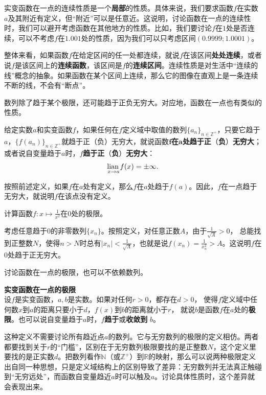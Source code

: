 \documentclass[12pt,UTF8,fontset=none]{ctexbook}
\begin{document}
实变函数在一点的连续性质是一个\textbf{局部}的性质。具体来说，我们要求函数$f$在实数$a$及其附近有定义，但“附近”可以是任意近。这说明，讨论函数在一点的连续性时，我们可以避开考虑函数在其他地方的性质。比如，我们要讨论$f$在$1$处是否连续，可以不考虑$f$在$1.001$处的性质，因为我们可以只考虑区间$(0.9999;1.0001)$。

整体来看，如果函数$f$在给定区间的任一处都连续，就说$f$在该区间\textbf{处处连续}，或者说$f$是该区间上的\textbf{连续函数}，该区间是$f$的\textbf{连续区间}。连续性质是对生活中“连续的线”概念的抽象。如果函数在某个区间上连续，那么它的图像在直观上是一条连续不断的线，不会有“断点”。

数列除了趋于某个极限，还可能趋于正负无穷大。对应地，函数在一点也有类似的性质。
\begin{df}
    给定实数$a$和实变函数$f$，如果任何在$f$定义域中取值的数列$\{a_n\}_{n\in\mathbb{Z}^+}$，只要它趋于$a$，$\{f(a_n)\}_{n\in\mathbb{Z}^+}$就趋于正（负）无穷大，就说函数$\boldsymbol{f}$\textbf{在}$\boldsymbol{a}$\textbf{处趋于正}（\textbf{负}）\textbf{无穷大}；或者说自变量趋于$a$时，$f$\textbf{趋于正}（\textbf{负}）\textbf{无穷大}：
    $$  \underset{x \to a}{\operatorname{lian}\,} f(x) = \pm\infty. $$
\end{df}
按照前述定义，如果$f$在$a$处有定义，那么$f$在$a$处趋于$f(a)$。因此，$f$在一点趋于无穷大，就说明$f$在该点没有定义。

\begin{et}
    计算函数$f: x\mapsto \displaystyle\frac{1}{x^2}$在$0$处的极限。
\end{et}
\begin{so}
    考虑任意趋于$0$的非零数列$\{x_n\}$。按照定义，对任意正数$A$，由于$\frac{1}{\sqrt{A}} > 0$，
    总能找到正整数$N$，使得$n>N$时总有$|x_n| < \frac{1}{\sqrt{A}}$，也就是说$f(x_n) = \displaystyle\frac{1}{x_n^2} > A$。这说明$f$在$0$处趋于正无穷大。
\end{so}

讨论函数在一点的极限，也可以不依赖数列。
\begin{df}\textbf{实变函数在一点的极限}\\
    设$f$是实变函数，$a, b$是实数。如果对任何$r>0$，都存在$d>0$，
    使得$f$定义域中任何数$x$到$a$的距离只要小于$d$，$f(x)$到$b$的距离就小于$r$，
    就说$b$是函数$f$在$a$处的\textbf{极限}。也可以说自变量趋于$a$时，$f$\textbf{趋于}或\textbf{收敛到} $b$。
\end{df}
这种定义不需要讨论所有趋近点$a$的数列。它与无穷数列的极限的定义相仿。两者都要找到关于$r$的“门槛”，区别在于无穷数列极限要找的是正整数$N$，这个定义里要找的是正实数$d$。把数列看作$\mathbb{N}$（或$\mathbb{Z}^+$）到$\mathbb{R}$的映射，那么可以说两种极限定义出自同一种思想，只是定义域结构上的区别导致了差异：无穷数列并无法真正触碰到“无穷远处”，而函数自变量趋近$a$时可以触及$a$。讨论具体性质时，这个差异就会表现出来。
\end{document}
